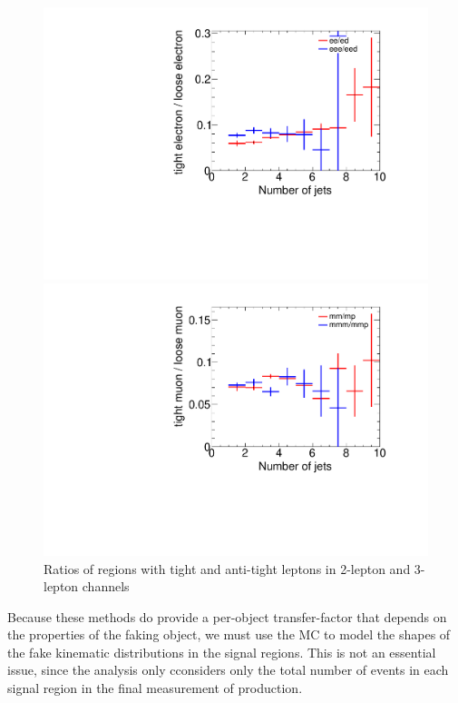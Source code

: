 \begin{figure}[htbp]
\begin{minipage}[h]{0.5\textwidth}
    \centering \includegraphics[width=\textwidth]{figs/fake/compare_2e_3e_NJet_ratios}
\end{minipage}\hfill
\begin{minipage}[h]{0.5\textwidth}
    \centering \includegraphics[width=\textwidth]{figs/fake/compare_2m_3m_NJet_ratios}
\end{minipage}\hfill
\caption{Ratios of regions with tight and anti-tight leptons in 2-lepton and 3-lepton channels}
\label{figure:background_njetr}
\end{figure}

Because these methods do provide a per-object transfer-factor that depends on the properties of the faking object, we must use the MC to model the shapes of the fake kinematic distributions in the signal regions. This is not an essential issue, since the analysis only cconsiders only the total number of events in each signal region in the final measurement of \tth production.

